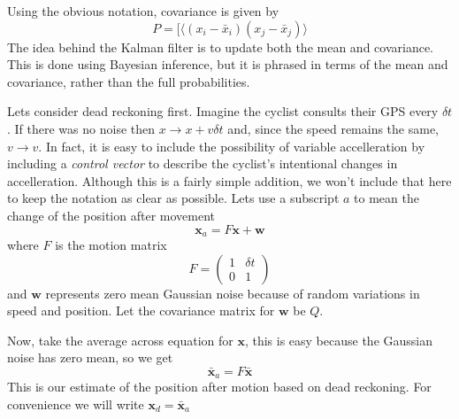 \documentclass{article}
\begin{document}
Using the obvious notation, covariance is given by
\begin{equation}
P=[\langle (x_i-\bar{x}_i)(x_j-\bar{x}_j)\rangle
\end{equation}
The idea behind the Kalman filter is to update both the mean and
covariance. This is done using Bayesian inference, but it is phrased
in terms of the mean and covariance, rather than the full
probabilities.

Lets consider dead reckoning first. Imagine the cyclist consults their
GPS every $\delta t$. If there was no noise then $x\rightarrow
x+v\delta t$ and, since the speed remains the same, 
$v\rightarrow v$. 
In fact, it is easy to include the possibility of variable
accelleration by including a \textsl{control vector} to describe the
cyclist's intentional changes in accelleration. Although this is a
fairly simple addition, we won't include that here to keep the
notation as clear as possible. Lets use a subscript $a$ to mean the
change of the position after movement
\begin{equation}
\textbf{x}_a=F\textbf{x}+\textbf{w}
\end{equation}
where $F$ is the motion matrix
\begin{equation}
F=\left(\begin{array}{cc}1&\delta t\\0&1\end{array}\right)
\end{equation}
and $\mathbf{w}$ represents zero mean Gaussian noise because of random
variations in speed and position. Let the covariance matrix for
$\mathbf{w}$ be $Q$.

Now, take the average across equation for $\mathbf{x}$, this is easy
because the Gaussian noise has zero mean, so we get
\begin{equation}
\mathbf{\bar{x}}_a=F\mathbf{\bar{x}}
\end{equation}
This is our estimate of the position after motion based on dead reckoning. For convenience we will write $\mathbf{x}_d=\mathbf{\bar{x}}_a$
\end{document}
